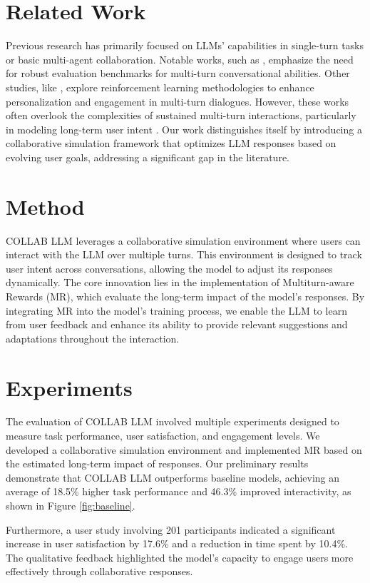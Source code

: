 \documentclass{article} %
\begin{document}
\section{Related Work}
\label{sec:related}
Previous research has primarily focused on LLMs' capabilities in single-turn tasks or basic multi-agent collaboration. Notable works, such as \cite{kwan2024mtevalam}, emphasize the need for robust evaluation benchmarks for multi-turn conversational abilities. Other studies, like \cite{wan2025enhancingpm}, explore reinforcement learning methodologies to enhance personalization and engagement in multi-turn dialogues. However, these works often overlook the complexities of sustained multi-turn interactions, particularly in modeling long-term user intent \cite{fan2024fairmtbenchbf}. Our work distinguishes itself by introducing a collaborative simulation framework that optimizes LLM responses based on evolving user goals, addressing a significant gap in the literature.

\section{Method}
\label{sec:method}
COLLAB LLM leverages a collaborative simulation environment where users can interact with the LLM over multiple turns. This environment is designed to track user intent across conversations, allowing the model to adjust its responses dynamically. The core innovation lies in the implementation of Multiturn-aware Rewards (MR), which evaluate the long-term impact of the model's responses. By integrating MR into the model's training process, we enable the LLM to learn from user feedback and enhance its ability to provide relevant suggestions and adaptations throughout the interaction.

\section{Experiments}
\label{sec:experiments}
The evaluation of COLLAB LLM involved multiple experiments designed to measure task performance, user satisfaction, and engagement levels. We developed a collaborative simulation environment and implemented MR based on the estimated long-term impact of responses. Our preliminary results demonstrate that COLLAB LLM outperforms baseline models, achieving an average of 18.5\% higher task performance and 46.3\% improved interactivity, as shown in Figure \ref{fig:baseline}.

Furthermore, a user study involving 201 participants indicated a significant increase in user satisfaction by 17.6\% and a reduction in time spent by 10.4\%. The qualitative feedback highlighted the model's capacity to engage users more effectively through collaborative responses.
\end{document}
